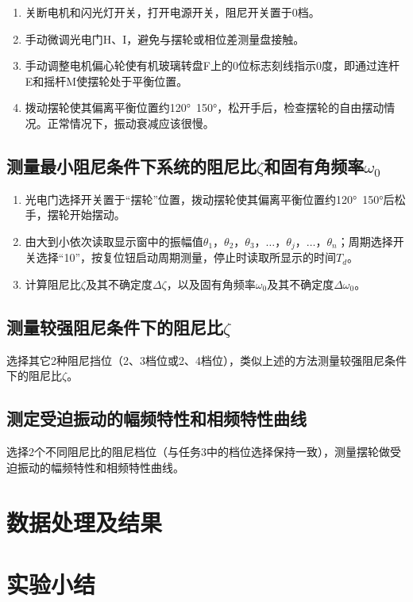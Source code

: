 \documentclass[12pt,a4paper]{amsart}
\begin{document}
\begin{enumerate}
    \item 关断电机和闪光灯开关，打开电源开关，阻尼开关置于0档。
    \item 手动微调光电门H、I，避免与摆轮或相位差测量盘接触。
    \item 手动调整电机偏心轮使有机玻璃转盘F上的0位标志刻线指示0度，即通过连杆E和摇杆M使摆轮处于平衡位置。
    \item 拨动摆轮使其偏离平衡位置约120°~150°，松开手后，检查摆轮的自由摆动情况。正常情况下，振动衰减应该很慢。
\end{enumerate}

\subsection{测量最小阻尼条件下系统的阻尼比$\zeta$和固有角频率$\omega_0$}
\begin{enumerate}
    \item 光电门选择开关置于“摆轮”位置，拨动摆轮使其偏离平衡位置约120°~150°后松手，摆轮开始摆动。
    \item 由大到小依次读取显示窗中的振幅值$\theta_1$，$\theta_2$，$\theta_3$，$\dots$，$\theta_j$，$\dots$，$\theta_n$；周期选择开关选择“10”，按复位钮启动周期测量，停止时读取所显示的时间$T_d$。
    \item 计算阻尼比$\zeta$及其不确定度$\Delta\zeta$，以及固有角频率$\omega_0$及其不确定度$\Delta\omega_0$。
\end{enumerate}

\subsection{测量较强阻尼条件下的阻尼比$\zeta$}
选择其它2种阻尼挡位（2、3档位或2、4档位），类似上述的方法测量较强阻尼条件下的阻尼比$\zeta$。

\subsection{测定受迫振动的幅频特性和相频特性曲线}
选择2个不同阻尼比的阻尼档位（与任务3中的档位选择保持一致），测量摆轮做受迫振动的幅频特性和相频特性曲线。

\section{数据处理及结果}

\section{实验小结}
\end{document}
